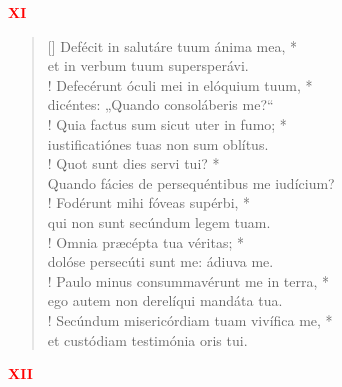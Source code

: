 


\def\greinitialformat#1{%
{\fontsize{39}{39}\selectfont #1}%
}




\vspace{0.3cm}
\begin{center}
 \textcolor{red}{ \bf XI}
\end{center}
\begin{verse}[\versewidth]
Defécit in salutáre tuum ánima mea, *\\
et in verbum tuum supersperávi.\\!
\vin Defecérunt óculi mei in elóquium tuum, *\\
\vin dicéntes: „Quando consoláberis me?“\\!
Quia factus sum sicut uter in fumo; *\\
iustificatiónes tuas non sum oblítus.\\!
\vin Quot sunt dies servi tui? *\\
\vin Quando fácies de persequéntibus me iudícium?\\!
Fodérunt mihi fóveas supérbi, *\\
qui non sunt secúndum legem tuam.\\!
\vin Omnia præcépta tua véritas; *\\
\vin dolóse persecúti sunt me: ádiuva me.\\!
Paulo minus consummavérunt me in terra, *\\
ego autem non derelíqui mandáta tua.\\!
\vin Secúndum misericórdiam tuam vivífica me, *\\
\vin et custódiam testimónia oris tui.\\
\end{verse}
\begin{center}
\textcolor{red}{\bf XII}\\
\end{center}
